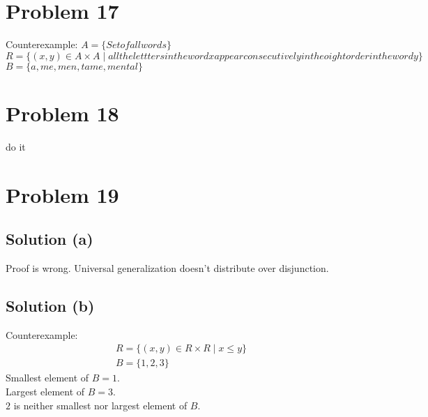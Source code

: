 \documentclass{article}
\begin{document}
\section{Problem 17}
Counterexample:
$A = \{Set of all words\}$ \\
$R = \{(x,y) \in A \times A \mid all the lettters in the word x appear
consecutively in the oight order in the word y\}$
$B = \{a, me, men, tame, mental\}$

\section{Problem 18}
do it

\section{Problem 19}
\subsection{Solution (a)}
Proof is wrong. Universal generalization doesn't distribute over
disjunction.

\subsection{Solution (b)}
Counterexample:
\begin{align*}
  R = \{(x,y) \in R \times R \mid x \leq y\} \\
  B = \{1,2,3\}
\end{align*}
Smallest element of $B = 1$. \\
Largest element of $B = 3$. \\
$2$ is neither smallest nor largest element of $B$.
  
\end{document}
